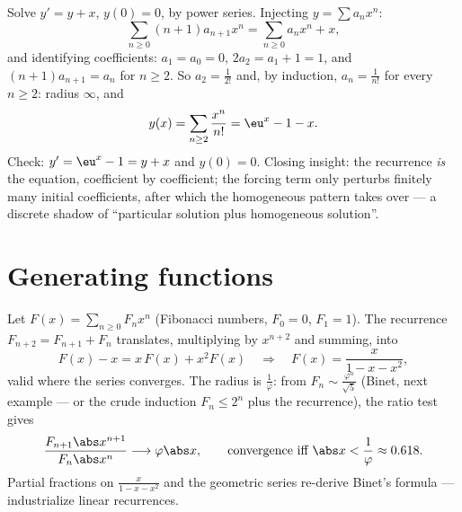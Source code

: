 \begin{example}\label{ex:b2:powerseries:odeforced}
Solve $y' = y + x$, $y(0) = 0$, by power series. Injecting $y =
\sum a_nx^n$:
\[
\sum_{n\geq0}(n+1)a_{n+1}x^n
= \sum_{n\geq0}a_nx^n + x ,
\]
and identifying coefficients: $a_1 = a_0 = 0$, $2a_2 = a_1 + 1
= 1$, and $(n+1)a_{n+1} = a_n$ for $n \geq 2$. So $a_2 =
\frac{1}{2!}$ and, by induction, $a_n = \frac{1}{n!}$ for every
$n \geq 2$: radius $\infty$, and
\[
y(x) = \sum_{n\geq2}\frac{x^n}{n!} = \eu^x - 1 - x .
\]
Check: $y' = \eu^x - 1 = y + x$ and $y(0) = 0$. Closing
insight: the recurrence \emph{is} the equation, coefficient by
coefficient; the forcing term only perturbs finitely many
initial coefficients, after which the homogeneous pattern takes
over --- a discrete shadow of ``particular solution plus
homogeneous solution''.
\end{example}

\section{Generating functions}

\begin{example}[Fibonacci]\label{ex:b2:powerseries:fibonacci}
Let $F(x) = \sum_{n\geq0} F_n x^n$ (Fibonacci numbers, $F_0 = 0$,
$F_1 = 1$). The recurrence $F_{n+2} = F_{n+1} + F_n$ translates,
multiplying by $x^{n+2}$ and summing, into
\[
F(x) - x = x\,F(x) + x^2 F(x)
\quad\Longrightarrow\quad
F(x) = \frac{x}{1 - x - x^2} ,
\]
valid where the series converges. The radius is
$\frac{1}{\varphi}$: from $F_n \sim
\frac{\varphi^n}{\sqrt5}$ (Binet, next example --- or the crude
induction $F_n \leq 2^n$ plus the recurrence), the ratio test
gives
\[
\frac{F_{n+1}\abs x^{n+1}}{F_n\abs x^n}
\longrightarrow \varphi\abs x ,
\qquad\text{convergence iff } \abs x < \frac1\varphi
\approx 0.618 .
\] Partial fractions on
$\frac{x}{1 - x - x^2}$ and the geometric series re-derive Binet's
formula ---  industrialize linear
recurrences.
\end{example}

